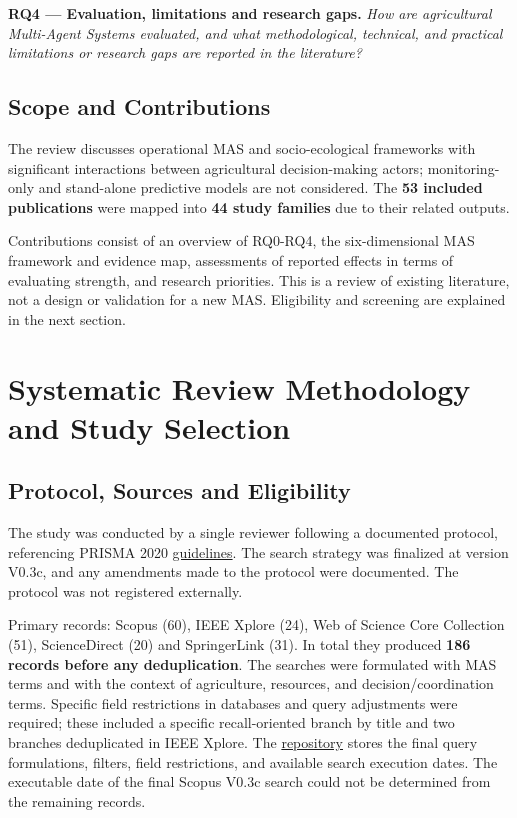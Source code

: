 \documentclass[11pt,a4paper]{article}
\begin{document}
\noindent\textbf{RQ4 --- Evaluation, limitations and research gaps.}
\emph{How are agricultural Multi-Agent Systems evaluated, and what methodological, technical, and practical limitations or research gaps are reported in the literature?}

\subsection{Scope and Contributions}

The review discusses operational MAS and socio-ecological frameworks with significant interactions between agricultural decision-making actors; monitoring-only and stand-alone predictive models are not considered. The \textbf{53 included publications} were mapped into \textbf{44 study families} due to their related outputs.

Contributions consist of an overview of RQ0-RQ4, the six-dimensional MAS framework and evidence map, assessments of reported effects in terms of evaluating strength, and research priorities. This is a review of existing literature, not a design or validation for a new MAS. Eligibility and screening are explained in the next section.





\section{Systematic Review Methodology and Study Selection}
\label{sec:methodology}

\subsection{Protocol, Sources and Eligibility}

The study was conducted by a single reviewer following a documented protocol, referencing PRISMA 2020 \href{https://doi.org/10.1136/bmj.n71}{guidelines}. The search strategy was finalized at version V0.3c, and any amendments made to the protocol were documented. The protocol was not registered externally.

Primary records: Scopus (60), IEEE Xplore (24), Web of Science Core Collection (51), ScienceDirect (20) and SpringerLink (31). In total they produced \textbf{186 records before any deduplication}. The searches were formulated with MAS terms and with the context of agriculture, resources, and decision/coordination terms. Specific field restrictions in databases and query adjustments were required; these included a specific recall-oriented branch by title and two branches deduplicated in IEEE Xplore. The \href{https://github.com/ChayanTalukder/Multi-Agent-Systems-for-Sustainable-Smart-Farming} {repository} stores the final query formulations, filters, field restrictions, and available search execution dates. The executable date of the final Scopus V0.3c search could not be determined from the remaining records.
\end{document}
